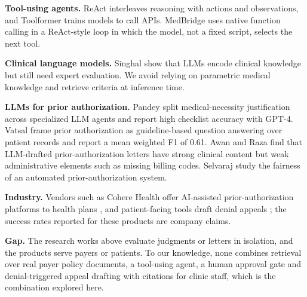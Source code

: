 \documentclass[final]{cvpr}
\begin{document}
\textbf{Tool-using agents.} ReAct \cite{yao2023react} interleaves reasoning with actions and observations, and Toolformer \cite{schick2023toolformer} trains models to call APIs. MedBridge uses native function calling in a ReAct-style loop in which the model, not a fixed script, selects the next tool.

\textbf{Clinical language models.} Singhal \etal\cite{singhal2022medpalm} show that LLMs encode clinical knowledge but still need expert evaluation. We avoid relying on parametric medical knowledge and retrieve criteria at inference time.

\textbf{LLMs for prior authorization.} Pandey \etal\cite{pandey2024multiagent} split medical-necessity justification across specialized LLM agents and report high checklist accuracy with GPT-4. Vatsal \etal\cite{vatsal2024gpt} frame prior authorization as guideline-based question answering over patient records and report a mean weighted F1 of 0.61. Awan and Raza \cite{awan2026pa} find that LLM-drafted prior-authorization letters have strong clinical content but weak administrative elements such as missing billing codes. Selvaraj \etal\cite{selvaraj2026fairness} study the fairness of an automated prior-authorization system.

\textbf{Industry.} Vendors such as Cohere Health offer AI-assisted prior-authorization platforms to health plans \cite{cohere2025profile}, and patient-facing tools draft denial appeals \cite{pymnts2026appeals}; the success rates reported for these products are company claims.

\textbf{Gap.} The research works above evaluate judgments or letters in isolation, and the products serve payers or patients. To our knowledge, none combines retrieval over real payer policy documents, a tool-using agent, a human approval gate and denial-triggered appeal drafting with citations for clinic staff, which is the combination explored here.

\end{document}
